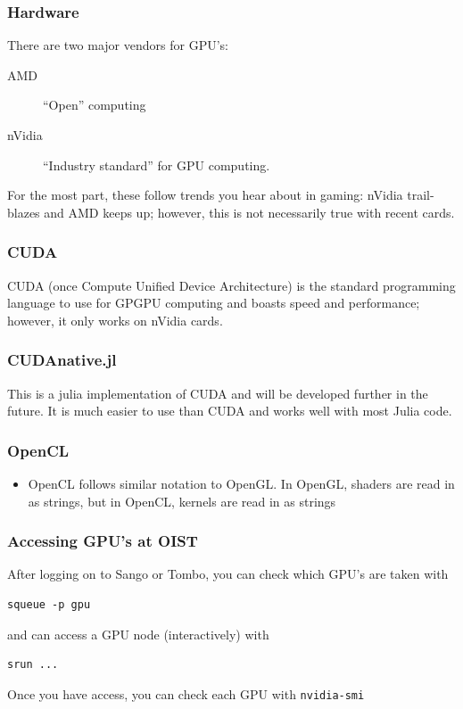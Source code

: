 \documentclass{beamer}
\begin{document}
\begin{frame}
\frametitle{Hardware}
There are two major vendors for GPU's: 
\begin{description}
\item[AMD] ``Open'' computing
\item[nVidia] ``Industry standard'' for GPU computing. 
\end{description}

For the most part, these follow trends you hear about in gaming: nVidia trail-blazes and AMD keeps up; however, this is not necessarily true with recent cards.
\end{frame}

\begin{frame}
\frametitle{CUDA}

CUDA (once Compute Unified Device Architecture) is the standard programming language to use for GPGPU computing and boasts speed and performance; however, it only works on nVidia cards.
\end{frame}

\begin{frame}
\frametitle{CUDAnative.jl}
This is a julia implementation of CUDA and will be developed further in the future. It is much easier to use than CUDA and works well with most Julia code.
\end{frame}

\begin{frame}
\frametitle{OpenCL}

\begin{itemize}
\item OpenCL follows similar notation to OpenGL. In OpenGL, shaders are read in as strings, but in OpenCL, kernels are read in as strings
\end{itemize}
\end{frame}

\begin{frame}[fragile]
\frametitle{Accessing GPU's at OIST}

After logging on to Sango or Tombo, you can check which GPU's are taken with 

\begin{lstlisting}
squeue -p gpu
\end{lstlisting}

and can access a GPU node (interactively) with

\begin{lstlisting}
srun ... 
\end{lstlisting}

Once you have access, you can check each GPU with \texttt{nvidia-smi}
\end{frame}
\end{document}
